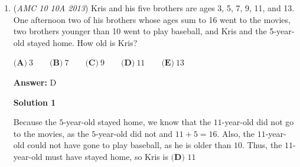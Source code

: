 \begin{enumerate}
 



\textbf{Solution 3}

The meaning of sharing costs equally is meaning that, after the vacation, they are equally dividing the money in a way such that, each person would have the same amount left. As each person spends an amount of money, greater than 100, let it be that they all had $200$ dollars to spend. This means that after the vacation we want the amount of money, they currently have. After the trip, Tom would've $95$ dollars, Dorothy would've $75$ dollars, and Hammy had $25$ dollars. This gives us a total of $95+75+25=195$ dollars. 

 We want to equally split this money, as that is what happens after splitting the cost equally. This means that we want Dorothy, Tom, and Hammy to each have $65$ dollars. We know that Tom gave Hammy $t$ dollars meaning that we want to split this money first. As Tom gives money to no one else, we want him to reach $65$ dollars in this trade, meaning that as Tom has $95$ dollars and Hammy has $25$ dollars, we can do a trade of $30$ so $t=30$. After this trade, we get that Tom has $65$ dollars, Hammy has $55$ dollars, and Dorothy has $75$ dollars.

 Next trade is where Dorothy gives $d$ dollars to Hammy. Dorothy has $75$ dollars and Hammy has $55$ dollars. As both of these don't have $65$ dollars and this is the last trade, we need to make sure both have $65$ dollars at the end. This is possible if $d=10$

 We want to find $t-d=30-10=\boxed{B) 20}$



	\item (\textit{AMC 10 10A 2013}) Kris and his five brothers are ages 3, 5, 7, 9, 11, and 13.  One afternoon two of his brothers whose ages sum to 16 went to the movies, two brothers younger than 10 went to play baseball, and Kris and the 5-year-old stayed home.  How old is Kris?


 $\textbf{(A)}\ 3 \qquad\textbf{(B)}\ 7  \qquad\textbf{(C)}\ 9 \qquad\textbf{(D)}\ 11 \qquad\textbf{(E)}\ 13$

 \textbf{Answer: }D



\textbf{Solution 1}

Because the $5$-year-old stayed home, we know that the $11$-year-old did not go to the movies, as the $5$-year-old did not and $11+5=16$.  Also, the $11$-year-old could not have gone to play baseball, as he is older than $10$.  Thus, the $11$-year-old must have stayed home, so Kris is $\boxed{\textbf{(D) }11}$





\end{enumerate}
